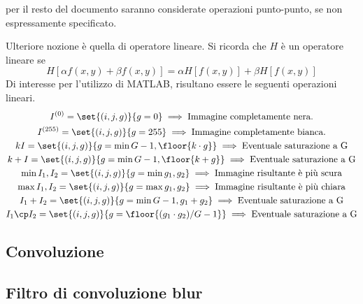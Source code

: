 \documentclass{subfiles}
\begin{document}
\begin{Note*}
    per il resto del documento saranno considerate operazioni punto-punto, se non espressamente specificato.
\end{Note*}

\noindent Ulteriore nozione è quella di operatore lineare. Si ricorda che \(H\) è un operatore lineare se
\begin{equation}
    H[\alpha f(x,y) + \beta f(x,y)] = \alpha H[f(x,y)] + \beta H[f(x, y)]
\end{equation}
Di interesse per l'utilizzo di MATLAB, risultano essere le seguenti operazioni lineari.
\[\begin{gathered}
        I^{(0)} = \set{(i,j,g)}{g = 0} \implies \text{Immagine completamente nera.} \\
        I^{(255)} = \set{(i,j,g)}{g = 255} \implies \text{Immagine completamente bianca.} \\
        kI = \set{(i,j,g)}{g = \min{G - 1, \floor{k \cdot g}}} \implies \text{Eventuale saturazione a G} \\
        k + I = \set{(i,j,g)}{g = \min{G - 1, \floor{k + g}}} \implies \text{Eventuale saturazione a G} \\
        \min{I_{1}, I_{2}} = \set{(i,j,g)}{g = \min{g_{1}, g_{2}}} \implies \text{Immagine risultante è più scura} \\
        \max{I_{1}, I_{2}} = \set{(i,j,g)}{g = \max{g_{1}, g_{2}}} \implies \text{Immagine risultante è più chiara} \\
        I_{1} + I_{2} = \set{(i,j,g)}{g = \min{G - 1, g_{1} + g_{2}}} \implies \text{Eventuale saturazione a G} \\
        I_{1} \cp I_{2} = \set{(i,j,g)}{g = \floor{(g_{1} \cdot g_{2})/G - 1}} \implies \text{Eventuale saturazione a G} \\
    \end{gathered}\]
\clearpage

\subsection{Convoluzione}


\subsection{Filtro di convoluzione blur}

\clearpage
\end{document}
